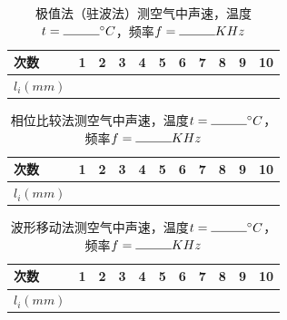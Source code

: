 \documentclass{ctexart}
\begin{document}
\begin{table}[!h]
    \centering
    \caption{极值法（驻波法）测空气中声速，温度$t = \rule{1cm}{0.4pt} ^\circ C$，频率$f = \rule{1cm}{0.4pt} KHz$}
    \begin{tabular}{|m{1.5cm}<{\centering}|m{0.7cm}<{\centering}|m{0.7cm}<{\centering}|m{0.7cm}<{\centering}|m{0.7cm}<{\centering}|m{0.7cm}<{\centering}|m{0.7cm}<{\centering}|m{0.7cm}<{\centering}|m{0.7cm}<{\centering}|m{0.7cm}<{\centering}|m{0.7cm}<{\centering}|}
        \hline
        次数& 1 & 2 & 3 & 4 & 5 & 6 & 7 & 8 & 9 & 10 \\ 
        \hline
        $l_i(mm)$& & & & & & & & & & \\
        \hline
    \end{tabular}
\end{table}

\begin{table}[!h]
    \centering
    \caption{相位比较法测空气中声速，温度$t = \rule{1cm}{0.4pt} ^\circ C$，频率$f = \rule{1cm}{0.4pt} KHz$}
    \begin{tabular}{|m{1.5cm}<{\centering}|m{0.7cm}<{\centering}|m{0.7cm}<{\centering}|m{0.7cm}<{\centering}|m{0.7cm}<{\centering}|m{0.7cm}<{\centering}|m{0.7cm}<{\centering}|m{0.7cm}<{\centering}|m{0.7cm}<{\centering}|m{0.7cm}<{\centering}|m{0.7cm}<{\centering}|}
        \hline
        次数& 1 & 2 & 3 & 4 & 5 & 6 & 7 & 8 & 9 & 10 \\ 
        \hline
        $l_i(mm)$& & & & & & & & & & \\
        \hline
    \end{tabular}
\end{table}

\begin{table}[!h]
    \centering
    \caption{波形移动法测空气中声速，温度$t = \rule{1cm}{0.4pt} ^\circ C$，频率$f = \rule{1cm}{0.4pt} KHz$}
    \begin{tabular}{|m{1.5cm}<{\centering}|m{0.7cm}<{\centering}|m{0.7cm}<{\centering}|m{0.7cm}<{\centering}|m{0.7cm}<{\centering}|m{0.7cm}<{\centering}|m{0.7cm}<{\centering}|m{0.7cm}<{\centering}|m{0.7cm}<{\centering}|m{0.7cm}<{\centering}|m{0.7cm}<{\centering}|}
        \hline
        次数& 1 & 2 & 3 & 4 & 5 & 6 & 7 & 8 & 9 & 10 \\ 
        \hline
        $l_i(mm)$& & & & & & & & & & \\
        \hline
    \end{tabular}
\end{table}
\end{document}
